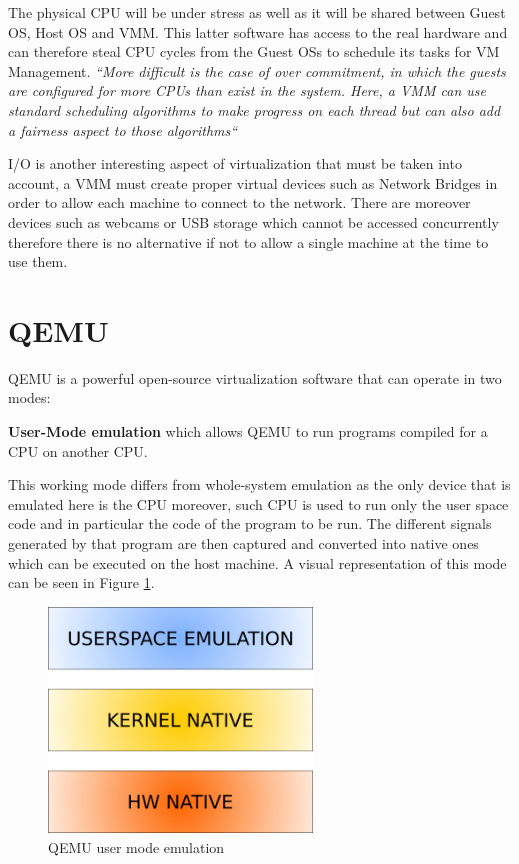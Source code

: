 The physical CPU will be under stress as well as it will be shared between Guest OS, Host OS and VMM. This latter software has access to the real hardware and can therefore steal CPU cycles from the Guest OSs to schedule its tasks for VM Management.
\textit{``More difficult is the case of over commitment, in which the guests are configured for more CPUs than exist in the system. Here, a VMM can use standard scheduling algorithms to make progress on each thread but can also add a fairness aspect to those algorithms``}~\cite{os}

I/O is another interesting aspect of virtualization that must be taken into account, a VMM must create proper virtual devices such as Network Bridges in order to allow each machine to connect to the network. There are moreover devices such as webcams or USB storage which cannot be accessed concurrently therefore there is no alternative if not to allow a single machine at the time to use them.


\section{QEMU}

QEMU is a powerful open-source virtualization software that can operate in two modes: 

\textbf{User-Mode emulation} which allows QEMU to run programs compiled for a CPU on another CPU.

This working mode differs from whole-system emulation as the only device that is emulated here is the CPU moreover, such CPU is used to run only the user space code and in particular the code of the program to be run. The different signals generated by that program are then captured and converted into native ones which can be executed on the host machine. A visual representation of this mode can be seen in Figure \ref{fig:quser}.

\begin{figure}[htp]
\centering
\includegraphics[width=7cm]{images/qemu-user.png}
\caption{QEMU user mode emulation~\cite{quser}}
\label{fig:quser}
\end{figure}

